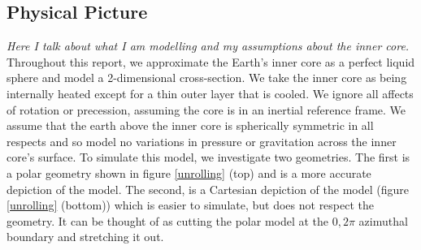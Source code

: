\documentclass{article}
\begin{document}


\newpage
\subsection*{Physical Picture}
{\it{Here I talk about what I am modelling and my assumptions about the inner core.}}
\vspace{0.3cm}
\newline
Throughout this report, we approximate the Earth's inner core as a perfect liquid sphere and model a 
2-dimensional cross-section. We take the inner core as being internally heated except for a thin 
outer layer that is cooled. We ignore all affects of rotation or precession, assuming the core is 
in an inertial reference frame. We assume that the earth above the inner core is spherically 
symmetric in all respects and so model no variations in pressure or gravitation across the inner 
core's surface.
\newline
To simulate this model, we investigate two geometries. The first is a polar geometry shown in figure \ref{unrolling} (top) and is a more accurate depiction of the model. The second, is a Cartesian depiction of the model (figure \ref{unrolling} (bottom)) which is easier to simulate, but does not respect the geometry. It can be thought of as cutting the polar model at the $0,2\pi$ azimuthal boundary and stretching it out. 
\end{document}
